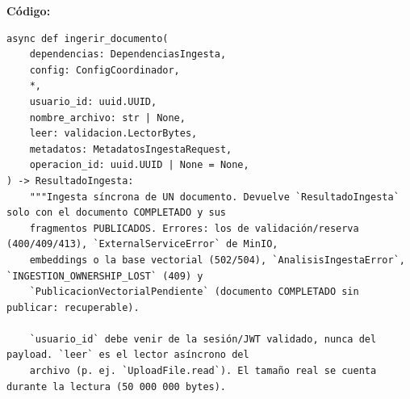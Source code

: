 \documentclass[11pt,a4paper]{article}
\begin{document}
\textbf{Código:}
\begin{lstlisting}
async def ingerir_documento(
    dependencias: DependenciasIngesta,
    config: ConfigCoordinador,
    *,
    usuario_id: uuid.UUID,
    nombre_archivo: str | None,
    leer: validacion.LectorBytes,
    metadatos: MetadatosIngestaRequest,
    operacion_id: uuid.UUID | None = None,
) -> ResultadoIngesta:
    """Ingesta síncrona de UN documento. Devuelve `ResultadoIngesta` solo con el documento COMPLETADO y sus
    fragmentos PUBLICADOS. Errores: los de validación/reserva (400/409/413), `ExternalServiceError` de MinIO,
    embeddings o la base vectorial (502/504), `AnalisisIngestaError`, `INGESTION_OWNERSHIP_LOST` (409) y
    `PublicacionVectorialPendiente` (documento COMPLETADO sin publicar: recuperable).

    `usuario_id` debe venir de la sesión/JWT validado, nunca del payload. `leer` es el lector asíncrono del
    archivo (p. ej. `UploadFile.read`). El tamaño real se cuenta durante la lectura (50 000 000 bytes).


\end{lstlisting}
\end{document}
